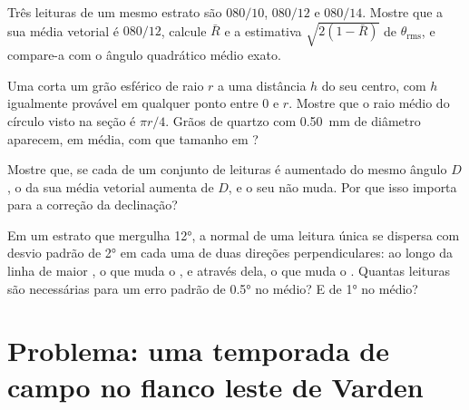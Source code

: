 \begin{exercise}[$\star\star$]\label{exo:b1:field-lab-methods-1:9}
Três leituras de um mesmo estrato são $080/10$, $080/12$ e $080/14$. Mostre que a sua média vetorial é $080/12$, calcule $\bar R$ e a estimativa $\sqrt{2(1 - \bar R)}$ de $\theta_{\text{rms}}$, e compare-a com o ângulo quadrático médio exato.
\end{exercise}

\begin{exercise}[$\star\star\star$]\label{exo:b1:field-lab-methods-1:10}
Uma  corta um grão esférico de raio $r$ a uma distância $h$ do seu centro, com $h$ igualmente provável em qualquer ponto entre 0 e $r$. Mostre que o raio médio do círculo visto na seção é $\pi r/4$. Grãos de quartzo com \qty{0.50}{mm} de diâmetro aparecem, em média, com que tamanho em ?
\end{exercise}

\begin{exercise}[$\star\star\star$]\label{exo:b1:field-lab-methods-1:11}
Mostre que, se cada  de um conjunto de leituras é aumentado do mesmo ângulo $D$, o  da sua média vetorial aumenta de $D$, e o seu  não muda. Por que isso importa para a correção da declinação?
\end{exercise}

\begin{exercise}[$\star\star\star$]\label{exo:b1:field-lab-methods-1:12}
Em um estrato que mergulha \ang{12}, a normal de uma leitura única se dispersa com desvio padrão de \ang{2} em cada uma de duas direções perpendiculares: ao longo da linha de maior , o que muda o , e através dela, o que muda o . Quantas leituras são necessárias para um erro padrão de \ang{0.5} no  médio? E de \ang{1} no  médio?
\end{exercise}

\section{Problema: uma temporada de campo no flanco leste de Varden}

